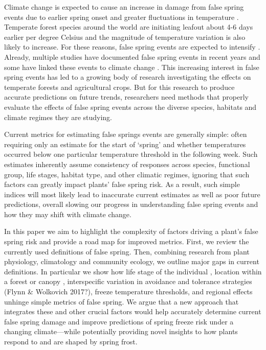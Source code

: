 \documentclass{article}\usepackage[]{graphicx}\usepackage[]{color}
\begin{document}
Climate change is expected to cause an increase in damage from false spring events due to earlier spring onset and greater fluctuations in temperature \citep{Cannell1986, Inouye2008, Martin2010}. Temperate forest species around the world are initiating leafout about 4-6 days earlier per degree Celsius \citep{Wolkovich2012, Polgar2014} and the magnitude of temperature variation is also likely to increase. For these reasons, false spring events are expected to intensify \citep{Kodra2011, Allstadt2015}. Already, multiple studies have documented false spring events in recent years \citep{Gu2008, Augspurger2009, Knudson2012, Augspurger2013} and some have linked these events to climate change \citep{Ault2013, Allstadt2015, Muffler2016, Xin2016}. This increasing interest in false spring events has led to a growing body of research investigating the effects on temperate forests and agricultural crops. But for this research to produce accurate predictions on future trends, researchers need methods that properly evaluate the effects of false spring events across the diverse species, habitats and climate regimes they are studying. 

Current metrics for estimating false springs events are generally simple: often requiring only an estimate for the start of `spring' and whether temperatures occurred below one particular temperature threshold in the following week. Such estimates inherently assume consistency of responses across species, functional group, life stages, habitat type, and other climatic regimes, ignoring that such factors can greatly impact plants' false spring risk. As a result, such simple indices will most likely lead to inaccurate current estimates as well as poor future predictions, overall slowing our progress in understanding false spring events and how they may shift with climate change. 

In this paper we aim to highlight the complexity of factors driving a plant's false spring risk and provide a road map for improved metrics. First, we review the currently used definitions of false spring. Then, combining research from plant physiology, climatology and community ecology, we outline major gaps in current definitions. In particular we show how life stage of the individual \citep{Caffarra2011}, location within a forest or canopy \citep{Augspurger2013}, interspecific variation in avoidance and tolerance strategies (Flynn \& Wolkovich 2017?), freeze temperature thresholds, and regional effects \citep{Martin2010} unhinge simple metrics of false spring. We argue that a new approach that integrates these and other crucial factors would help accurately determine current false spring damage and improve predictions of spring freeze risk under a changing climate---while potentially providing novel insights to how plants respond to and are shaped by spring frost. %
\end{document}
